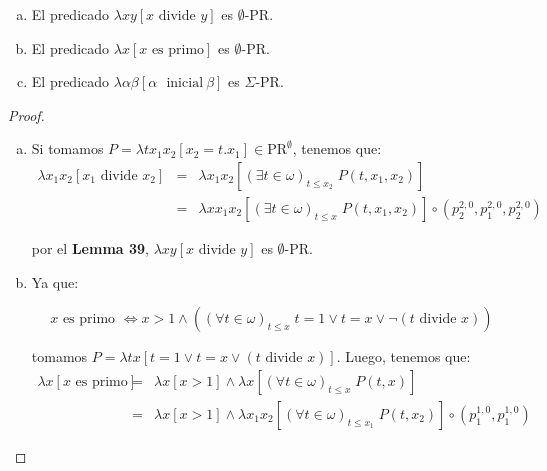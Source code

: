   \begin{lemma}
    \begin{enumerate}[a)]
      \item El predicado $\lambda xy\left[x \text{ divide } y\right]$ es $\emptyset$-PR.
      \item El predicado $\lambda x\left[x \text{ es primo}\right]$ es $\emptyset$-PR.
      \item El predicado $\lambda \alpha\beta \left[\alpha \text{\ }\mathrm{ inicial}\ \beta \right]$ es $\Sigma$-PR.
    \end{enumerate}
  \end{lemma}
  \begin{proof}
    \begin{enumerate}[a)]
      \item Si tomamos $P = \lambda tx_{1}x_{2}\left[x_{2}=t.x_{1}\right] \in \mathrm{PR}^{\emptyset}$, tenemos que:
        \begin{eqnarray*}
          \lambda x_{1}x_{2} \left[x_{1}\text{ divide } x_{2}\right] &=& \lambda x_{1}x_{2}\left[(\exists t
            \in \omega)_{t\leq x_{2}} \; P(t,x_{1},x_{2}) \right] \\
          &=& \lambda xx_{1}x_{2}\left[(\exists t \in \omega)_{t\leq x} \; P(t,x_{1},x_{2})\right] \circ
            \left(p_{2}^{2,0}, p_{1}^{2,0}, p_{2}^{2,0}\right)
        \end{eqnarray*}

        \PN por el \textbf{Lemma 39}, $\lambda xy\left[x \text{ divide } y\right]$ es $\emptyset$-PR.

      \item Ya que:

        \[
          x \text{ es primo } \Leftrightarrow x > 1 \wedge \left((\forall t \in \omega)_{t\leq x} \; t=1 \vee t=x \vee
          \lnot (t\text{ divide } x)\right)
        \]

        \PN tomamos $P = \lambda tx \left[ t=1 \vee t=x \vee (t \text{ divide } x)\right]$. Luego, tenemos que:
        \begin{eqnarray*}
          \lambda x \left[x \text{ es primo}\right] &=& \lambda x \left[x > 1\right] \wedge \lambda x
            \left[(\forall t \in \omega)_{t \leq x} \; P(t,x) \right] \\
          &=& \lambda x \left[x > 1\right] \wedge \lambda x_{1} x_{2} \left[(\forall t \in \omega)_{t \leq
            x_{1}} \; P(t,x_{2}) \right] \circ (p_{1}^{1,0}, p_{1}^{1,0})
        \end{eqnarray*}


\end{enumerate}
\end{proof}
